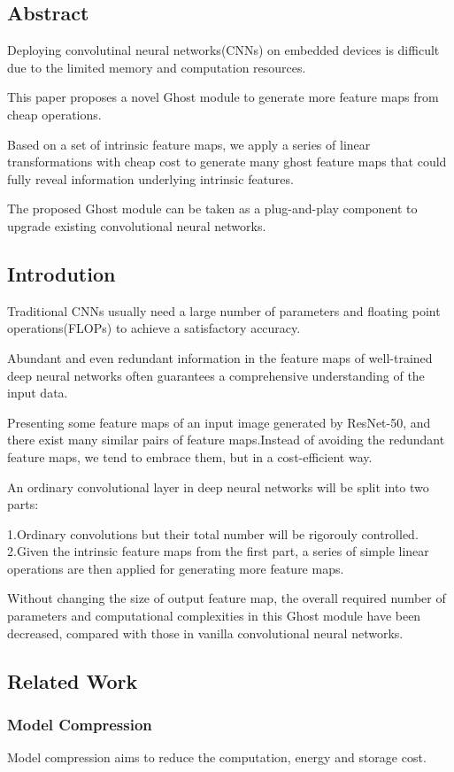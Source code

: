 \documentclass[11pt]{article}
\begin{document}
\subsection{Abstract}
Deploying convolutinal neural networks(CNNs) on embedded devices is difficult due to the limited memory and computation resources.

This paper proposes a novel Ghost module to generate more feature maps from cheap operations.

Based on a set of intrinsic feature maps, we apply a series of linear transformations with cheap cost to generate many ghost feature maps that could fully reveal information underlying intrinsic features.

The proposed Ghost module can be taken as a plug-and-play component to upgrade existing convolutional neural networks.

\subsection{Introdution}
Traditional CNNs usually need a large number of parameters and floating point operations(FLOPs) to achieve a satisfactory accuracy.

Abundant and even redundant information in the feature maps of well-trained deep neural networks often guarantees a comprehensive understanding of the input data.

Presenting some feature maps of an input image generated by ResNet-50, and there exist many similar pairs of feature maps.Instead of avoiding the redundant feature maps, we tend to embrace them, but in a cost-efficient way.

An ordinary convolutional layer in deep neural networks will be split into two parts:

\noindent1.Ordinary convolutions but their total number will be rigorouly controlled.
\noindent2.Given the intrinsic feature maps from the first part, a series of simple linear operations are then applied for generating more feature maps.

Without changing the size of output feature map, the overall required number of parameters and computational complexities in this Ghost module have been decreased, compared with those in vanilla convolutional neural networks.
\subsection{Related Work}
\subsubsection{Model Compression}
Model compression aims to reduce the computation, energy and storage cost.
\end{document}
